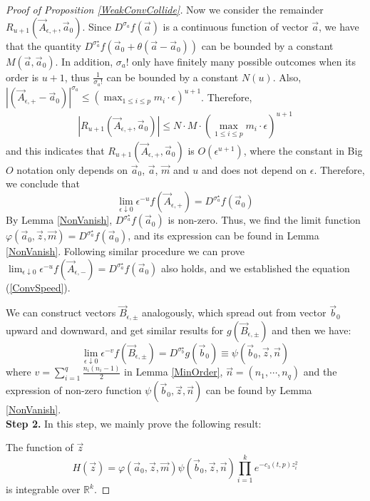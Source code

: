 \begin{proof}[Proof of Proposition \ref{WeakConvCollide}]
Now we consider the remainder $R_{u+1}(\vec{A}_{\epsilon,+},\vec{a}_{0})$. Since $D^{\sigma_{a}}f(\vec{a})$ is a continuous function of vector $\vec{a}$, we have that the quantity $D^{\sigma_{a}^{\star}}f(\vec{a}_{0}+\theta(\vec{a}-\vec{a}_{0}))$ can be bounded by a constant $M(\vec{a},\vec{a}_{0})$. In addition, $\sigma_{a}!$ only have finitely many possible outcomes when its order is $u+1$, thus $\frac{1}{\sigma_{a}!}$ can be bounded by a constant $N(u)$. Also, $|(\vec{A}_{\epsilon,+}-\vec{a}_{0})|^{\sigma_{a}}\leqslant (\max_{1\leqslant i\leqslant p}m_{i}\cdot \epsilon)^{u+1}$. Therefore,
\begin{align*}
	|R_{u+1}(\vec{A}_{\epsilon,+},\vec{a}_{0})|\leqslant N\cdot M \cdot (\max_{1\leqslant i\leqslant p}m_{i}\cdot \epsilon)^{u+1}
\end{align*}
and this indicates that $R_{u+1}(\vec{A}_{\epsilon,+},\vec{a}_{0})$ is $O(\epsilon^{u+1})$, where the constant in Big $O$ notation only depends on $\vec{a}_{0}$, $\vec{a}$, $\vec{m}$ and $u$ and does not depend on $\epsilon$. Therefore, we conclude that 
$$\lim_{\epsilon\downarrow 0}\epsilon^{-u}f(\vec{A}_{\epsilon,+})=D^{\sigma_{a}^{\star}}f(\vec{a}_{0})$$
By Lemma \ref{NonVanish}, $D^{\sigma_{a}^{\star}}f(\vec{a}_{0})$ is non-zero. Thus, we find the limit function $\varphi(\vec{a}_{0},\vec{z},\vec{m})=D^{\sigma_{a}^{\star}}f(\vec{a}_{0})$, and its expression can be found in Lemma \ref{NonVanish}. Following similar procedure we can prove $\lim_{\epsilon\downarrow 0}\epsilon^{-u}f(\vec{A}_{\epsilon,-})=D^{\sigma_{a}^{\star}}f(\vec{a}_{0})$ also holds, and we established the equation (\ref{ConvSpeed}).

We can construct vectors $\vec{B}_{\epsilon,\pm}$ analogously, which spread out from vector $\vec{b}_{0}$ upward and downward, and get similar results for $g(\vec{B}_{\epsilon,\pm})$ and then we have:
$$\lim_{\epsilon\downarrow 0}\epsilon^{-v}f(\vec{B}_{\epsilon,\pm})=D^{\sigma_{b}^{\star}}g(\vec{b}_{0})\equiv\psi(\vec{b}_{0},\vec{z},\vec{n})$$
where $v=\sum_{i=1}^{q}\frac{n_{i}(n_{i}-1)}{2}$ in Lemma \ref{MinOrder}, $\vec{n}=(n_{1},\cdots,n_{q})$ and the expression of non-zero function $\psi(\vec{b}_{0},\vec{z},\vec{n})$ can be found by Lemma \ref{NonVanish}.\\
\textbf{Step 2. }In this step, we mainly prove the following result:

The function of $\vec{z}$ $$H(\vec{z})=\varphi(\vec{a}_{0},\vec{z},\vec{m})\psi(\vec{b}_{0},\vec{z},\vec{n})\prod_{i=1}^{k}e^{-c_{3}(t,p)z_{i}^{2}}$$ is integrable over $\mathbb{R}^{k}$.


\end{proof}
